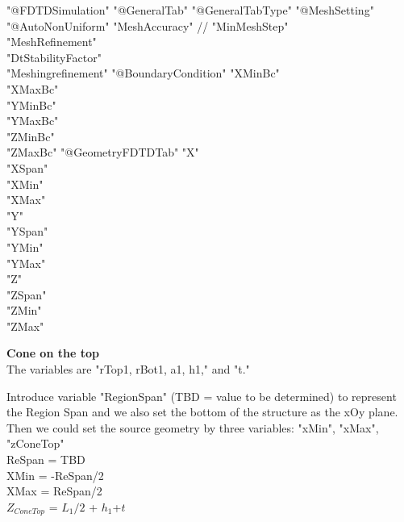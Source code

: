\documentclass[12pt]{article}
\numberwithin{equation}{section}
\numberwithin{equation}{section}
\begin{document}
\begin{outline}[enumerate]
      \2 "@FDTDSimulation"
        \3 "@GeneralTab"
        \3 "@GeneralTabType"
        \3 "@MeshSetting"
          \4 "@AutoNonUniform"
           "MeshAccuracy" // "MinMeshStep" \\ "MeshRefinement" \\"DtStabilityFactor" \\"Meshingrefinement"
        \3 "@BoundaryCondition"
         "XMinBc" \\ "XMaxBc" \\"YMinBc" \\"YMaxBc" \\"ZMinBc" \\"ZMaxBc"
        \3 "@GeometryFDTDTab"   
        "X" \\"XSpan" \\ "XMin" \\"XMax" \\  "Y" \\"YSpan" \\ "YMin" \\"YMax" \\ "Z" \\"ZSpan" \\ "ZMin" \\"ZMax" 
                 
          \2 \textbf {Cone on the top} \\
          The variables are "rTop1, rBot1, a1, h1," and "t." 
          
          
          

            
            Introduce variable "RegionSpan" (TBD = value to be determined) to represent the Region Span 		    and we also set the bottom of the structure as the xOy plane. Then we could set the source		    geometry by three variables: "xMin", "xMax", "zConeTop"  \\
            	ReSpan = TBD \\
		XMin = -ReSpan/2 \\
		XMax = ReSpan/2 \\
		$Z_{ConeTop}$ = $L_{1}/2$ + $h_1$+$t$ \\
	  


\end{outline}
\end{document}
